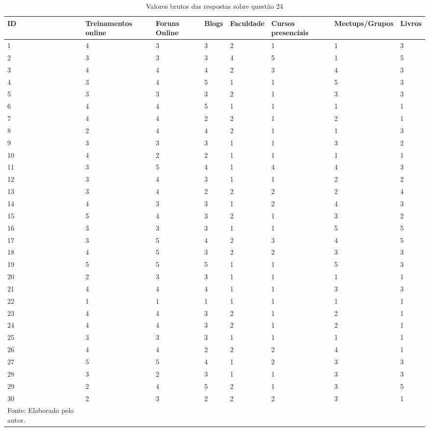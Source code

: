 \documentclass[twoside,english,brazilian]{UNISINOSartigo}
\newcommand{\source}[1]{\caption*{Fonte: {#1}} }
\begin{document}
{\footnotesize\begin{longtable}[H]{llllllll}
\caption{Valores brutos das respostas sobre questão 24}
\hline
ID & Treinamentos online & Foruns Online & Blogs & Faculdade & Cursos presenciais & Meetups/Grupos & Livros \\
\hline
\endfirsthead
%
\endhead
%
1 & 4 & 3 & 3 & 2 & 1 & 1 & 3 \\
2 & 3 & 3 & 3 & 4 & 5 & 1 & 5 \\
3 & 4 & 4 & 4 & 2 & 3 & 4 & 3 \\
4 & 3 & 4 & 5 & 1 & 1 & 5 & 3 \\
5 & 3 & 3 & 3 & 2 & 1 & 3 & 3 \\
6 & 4 & 4 & 5 & 1 & 1 & 1 & 1 \\
7 & 4 & 4 & 2 & 2 & 1 & 2 & 1 \\
8 & 2 & 4 & 4 & 2 & 1 & 1 & 3 \\
9 & 3 & 3 & 3 & 1 & 1 & 3 & 2 \\
10 & 4 & 2 & 2 & 1 & 1 & 1 & 1 \\
11 & 3 & 5 & 4 & 1 & 4 & 4 & 3 \\
12 & 3 & 4 & 3 & 1 & 1 & 2 & 2 \\
13 & 3 & 4 & 2 & 2 & 2 & 2 & 4 \\
14 & 4 & 3 & 3 & 1 & 2 & 4 & 3 \\
15 & 5 & 4 & 3 & 2 & 1 & 3 & 2 \\
16 & 3 & 3 & 3 & 1 & 1 & 5 & 5 \\
17 & 3 & 5 & 4 & 2 & 3 & 4 & 5 \\
18 & 4 & 5 & 3 & 2 & 2 & 3 & 3 \\
19 & 5 & 5 & 5 & 1 & 1 & 5 & 3 \\
20 & 2 & 3 & 3 & 1 & 1 & 1 & 1 \\
21 & 4 & 4 & 4 & 1 & 1 & 3 & 3 \\
22 & 1 & 1 & 1 & 1 & 1 & 1 & 1 \\
23 & 4 & 4 & 3 & 2 & 1 & 2 & 1 \\
24 & 4 & 4 & 3 & 2 & 1 & 2 & 1 \\
25 & 3 & 3 & 3 & 1 & 1 & 1 & 1 \\
26 & 4 & 4 & 2 & 2 & 2 & 4 & 1 \\
27 & 5 & 5 & 4 & 1 & 2 & 3 & 3 \\
28 & 3 & 2 & 3 & 1 & 1 & 3 & 3 \\
29 & 2 & 4 & 5 & 2 & 1 & 3 & 5 \\
30 & 2 & 3 & 2 & 2 & 2 & 3 & 1 \\
\hline
\source{Elaborado pelo autor.}
\end{longtable}}
\end{document}
